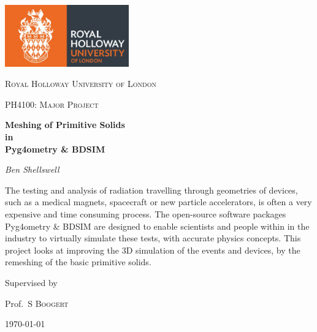\documentclass[12pt,a4paper]{article}
\begin{document}
\begin{titlepage}
	\centering
	\includegraphics[width=0.4\textwidth]{Images//Logos//rhul.jpg}\par\vspace{1cm}


	{\scshape\LARGE Royal Holloway University of London \par}
	\vspace{1cm}
	{\scshape\Large PH4100: Major Project\par}
	\vspace{1.5cm}
	{\huge\bfseries Meshing of Primitive Solids\\
	in\\
	Pyg4ometry \& BDSIM\par}
	\vspace{2cm}
	{\Large\itshape Ben Shellswell\par}
	\vfill

\begin{abstract}
\centering

\end{abstract}
The testing and analysis of radiation travelling through geometries of devices, such as a medical magnets, spacecraft or new particle accelerators, is often a very expensive and time consuming process. The open-source software packages Pyg4ometry \& BDSIM are designed to enable scientists and people within in the industry to virtually simulate these tests, with accurate physics concepts. This project looks at improving the 3D simulation of the events and devices, by the remeshing of the basic primitive solids.

	\vfill
	
	Supervised by\par
	Prof.~S \textsc{Boogert} 

	{\large \today\par}




\end{titlepage}
\end{document}
